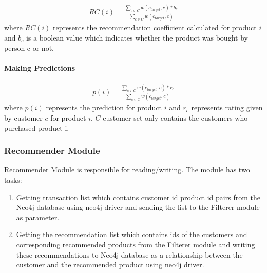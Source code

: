 	\begin{equation*} 
	\begin{split}
		RC(i) = \frac{\sum_{c \in C}^{} w(c_{target}, c)*b_{c}}{\sum_{c \in C}^{} w(c_{target}, c)}
	\end{split}
	\end{equation*}
	where $RC(i)$ represents the recommendation coefficient calculated for product $i$ and $b_{c}$ is a boolean value which indicates whether the product was bought by person c or not.

	
	\paragraph{Making Predictions}
	\begin{equation*} 
	\begin{split}
		p(i) = \frac{\sum_{c \in C}^{} w(c_{target}, c)*r_{c}}{\sum_{c \in C}^{} w(c_{target}, c)}
	\end{split}
	\end{equation*}
	where $p(i)$ represents the prediction for product $i$ and $r_{c}$ represents rating given by customer $c$ for product $i$. $C$ customer set only contains the customers who purchased product i.
	
	\subsubsection{Recommender Module} Recommender Module is responsible for reading/writing. The module has two tasks:
	\begin{enumerate}
		\item Getting transaction list which contains customer id product id pairs from the Neo4j database using neo4j driver and sending the list to the Filterer module as parameter.
		\item Getting the recommendation list which contains ids of the customers and corresponding recommended products from the Filterer module and writing these recommendations to Neo4j database as a relationship between the customer and the recommended product using neo4j driver.
	\end{enumerate}